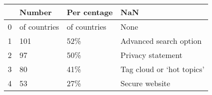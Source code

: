 \begin{tabular}{llll}
\toprule
{} &        Number &   Per centage &                        NaN \\
\midrule
0 &  of countries &  of countries &                       None \\
1 &           101 &           52\% &     Advanced search option \\
2 &            97 &           50\% &          Privacy statement \\
3 &            80 &           41\% &  Tag cloud or ‘hot topics’ \\
4 &            53 &           27\% &             Secure website \\
\bottomrule
\end{tabular}
